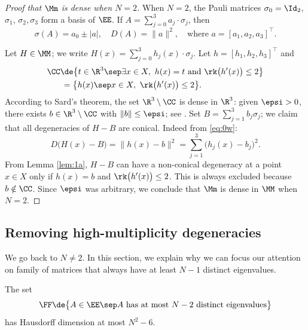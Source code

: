\begin{proof}[Proof that $\Mm$ is dense when $N=2$] When $N=2$, the Pauli matrices $\sigma_0 = \Id_2$, $\sigma_1$, $\sigma_2, \sigma_3$ form a basis of $\EE$. If $A = \sum_{j=0}^3 a_j \cdot \sigma_j$, then
\begin{equation}\label{eq:0w}
\sigma(A) = a_0 \pm |a|, \quad D(A) = \| a \|^2, \quad \text{where } a = [a_1,a_2,a_3]^\top.
\end{equation}

Let $H \in \MM$; we write $H(x) = \sum_{j=0}^3 h_j(x) \cdot \sigma_j$.
Let $h = [h_1,h_2,h_3]^\top$ and
\begin{align*}
\CC &\de \bigl\{ t \in \R^3\sep \exists x \in X, \ h(x) = t \text{ and } \rk \bigl(h'(x)\bigr) \leq 2 \bigr\} \\
&\,=
\bigl\{ h(x)\sep x \in X, \ \rk \bigl(h'(x)\bigr) \leq 2 \bigr\}.
\end{align*}
According to Sard's theorem, the set $\R^3 \setminus \CC$ is dense in $\R^3$: given $\epsi > 0$, there exists $b \in \R^3 \setminus \CC$ with $\| b \| \leq \epsi$; see \eg \cite[\S1.7]{GP74}. Set $B = \sum_{j=1}^3 b_j \sigma_j$; we claim that all degeneracies of $H-B$ are conical. Indeed from \eqref{eq:0w}:
\begin{equation*}
D\bigl(H(x) - B\bigr) = \big\| h(x) - b \big\|^2 = \sum_{j=1}^3 \bigl( h_j(x) -b_j \bigr)^2.
\end{equation*}
From Lemma \ref{lem:1a}, $H-B$ can have a non-conical degeneracy at a point $x \in X$ only if $h(x) = b$ and $\rk \bigl(h'(x)\bigr) \leq 2$. This is always excluded because $b \notin \CC$. Since $\epsi$ was arbitrary, we conclude that $\Mm$ is dense in $\MM$ when $N=2$. \end{proof}

\subsection{Removing high-multiplicity degeneracies}\label{sec:3.2} We go back to $N \neq 2$. In this section, we explain why we can focus our attention on family of matrices that always have at least $N-1$ distinct eigenvalues.

\begin{lem}\label{lem:1d} The set
\begin{equation*}
\FF \de \bigl\{ A \in \EE \sep A \text{ has at most $N-2$ distinct eigenvalues} \bigr\}
\end{equation*}
has Hausdorff dimension at most $N^2-6$.
\end{lem}

